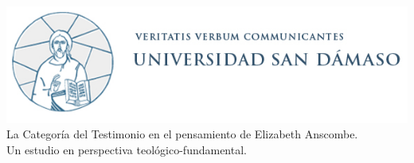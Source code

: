 \begin{titlepage}

  \begin{center}
      \includegraphics[width=8.71 cm]{./img/sandamaso}
      \huge La Categoría del Testimonio en el pensamiento de Elizabeth Anscombe.\\
      \large Un estudio en perspectiva teológico-fundamental.
  \end{center}

\end{titlepage}
